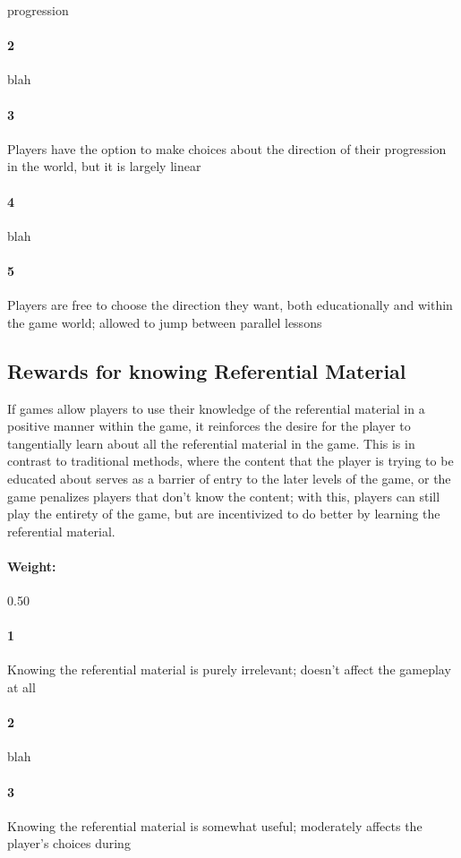 progression\paragraph{2}blah\paragraph{3}Players have the option to make choices about the direction of their progression in the world, but it is largely linear\paragraph{4}blah\paragraph{5}Players are free to choose the direction they want, both educationally and within the game world; allowed to jump between parallel lessons\subsection{Rewards for knowing Referential Material}{If games allow players to use their knowledge of the referential material in a positive manner within the game, it reinforces the desire for the player to tangentially learn about all the referential material in the game. This is in contrast to traditional methods, where the content that the player is trying to be educated about serves as a barrier of entry to the later levels of the game, or the game penalizes players that don't know the content; with this, players can still play the entirety of the game, but are incentivized to do better by learning the referential material.} \paragraph{Weight:}{0.50}\paragraph{1}Knowing the referential material is purely irrelevant; doesn’t affect the gameplay at all\paragraph{2}blah\paragraph{3}Knowing the referential material is somewhat useful; moderately affects the player's choices during 